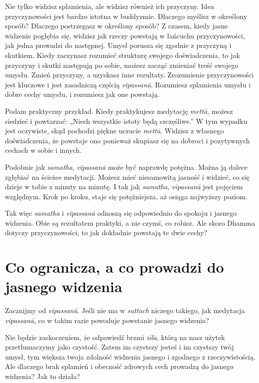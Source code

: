 \documentclass[12pt,openany]{book}
\begin{document}
Nie tylko widzisz splamienia, ale widzisz również ich przyczyny. Idea przyczynowości jest bardzo istotna w buddyzmie. \linebreak Dlaczego myślisz w określony sposób? Dlaczego postrzegasz w określony sposób? Z czasem, kiedy jasne widzenie pogłębia się, widzisz jak rzeczy powstają w łańcuchu przyczynowości, jak \linebreak jedna prowadzi do następnej. Umysł porusza się zgodnie z przyczyną i skutkiem. Kiedy zaczynasz rozumieć strukturę swojego doświadczenia, to jak przyczyny i skutki następują po sobie, możesz zacząć zmieniać treść swojego umysłu. Zmień przyczyny, a uzyskasz inne rezultaty. Zrozumienie przyczynowości jest klu\-czo\-we i jest zasadniczą częścią \textit{vipassanā}. Rozumiesz splamienia umysłu i dobre cechy umysłu, i rozumiesz jak one powstają.

Podam praktyczny przykład. Kiedy praktykujesz medytację \textit{mettā}, możesz siedzieć i powtarzać: „Niech wszystkie istoty będą szczęśliwe.” W tym wypadku jest oczywiste, skąd pochodzi piękne uczucie \textit{mettā}. Widzisz z własnego doświadczenia, że powstaje ono ponieważ skupiasz się na dobroci i pozytywnych cechach w sobie i innych.

Podobnie jak \textit{samatha}, \textit{vipassanā} może być naprawdę potężna. Można ją dalece zgłębiać na ścieżce medytacji. Możesz mieć niesamowitą jasność i widzieć, co się dzieje w tobie z minuty na minutę. I tak jak  \textit{samatha}, \textit{vipassanā} jest pojęciem względnym. Krok po kroku, staje się potężniejsza, aż osiąga najwyższy poziom.

Tak więc \textit{samatha} i \textit{vipassanā} odnoszą się odpowiednio do spokoju i jasnego widzenia. Obie są rezultatem praktyki, a nie czymś, co robisz. Ale skoro Dhamma dotyczy przyczynowości, to jak dokładnie powstają te dwie cechy?

\chapter*{Co ogranicza, a co prowadzi do jasnego widzenia}

Zacznijmy od \textit{vipassanā}. Jeśli nie ma w \textit{suttach} niczego takiego, jak medytacja \textit{vipassanā}, co w takim razie powoduje powstanie jasnego widzenia?

Nie będzie zaskoczeniem, że odpowiedź brzmi \textit{sīla}, którą na nasz użytek przetłumaczymy jako czystość. Zatem im czystszy jesteś i im czystszy twój umysł, tym większa twoja zdolność widzenia jasnego i zgodnego z rzeczywistością. Ale dlaczego brak splamień i obecność zdrowych cech prowadzą do jasnego widzenia? Jak to działa?
\end{document}
